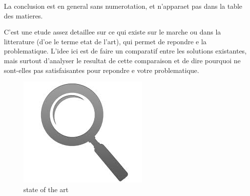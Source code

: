 \begin{spacing}{1.2}
La conclusion est en general sans numerotation, et n'apparaet pas dans la table des matieres.

C'est une etude assez detaillee sur ce qui existe sur le marche ou dans la litterature (d'oe 
le terme etat de l'art), qui permet de repondre e la problematique. L'idee ici est de faire 
un comparatif entre les solutions existantes, mais surtout d'analyser le resultat de cette 
comparaison et de dire pourquoi ne sont-elles pas satisfaisantes pour repondre e votre 
problematique.
\begin{figure}[!ht]\centering
\includegraphics[scale=0.9]{art.jpg}
\caption{state of the art}
\label{fig:fig1}
\end{figure}





\end{spacing}

